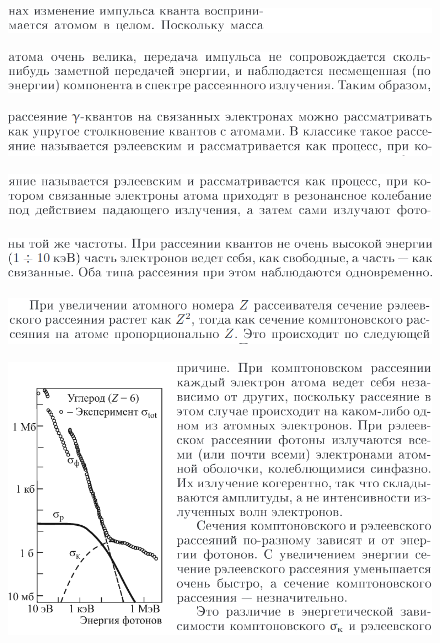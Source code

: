 \documentclass{article}
\theoremstyle{remark}
\begin{document}
\begin{figure}[htp]
    \includegraphics[width=1.2\linewidth]{15.png}
\end{figure}
\begin{figure}[htp]
    \includegraphics[width=1.2\linewidth]{16.png}
\end{figure}
\begin{figure}[htp]
    \includegraphics[width=1.2\linewidth]{17.png}
\end{figure}
\begin{figure}[htp]
    \includegraphics[width=1.2\linewidth]{18.png}
\end{figure}
\begin{figure}[htp]
    \includegraphics[width=1.2\linewidth]{19.png}
\end{figure}
\begin{figure}[htp]
    \includegraphics[width=1.2\linewidth]{20.png}
\end{figure}
\begin{figure}[htp]
    \includegraphics[width=1.2\linewidth]{21.png}
\end{figure}
\end{document}

